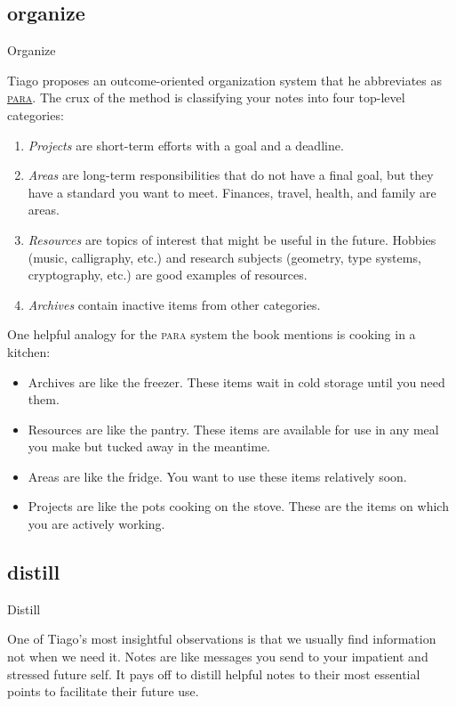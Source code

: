 \documentclass{article}
\begin{document}
\subsection{organize}{Organize}

Tiago proposes an outcome-oriented organization system that he abbreviates as \href{https://fortelabs.com/blog/para/}{\textsc{para}}.
The crux of the method is classifying your notes into four top-level categories:
\begin{enumerate}
  \item 
    \emph{Projects} are short-term efforts with a goal and a deadline.
  \item 
    \emph{Areas} are long-term responsibilities that do not have a final goal, but they have a standard you want to meet.
    Finances, travel, health, and family are areas.
  \item 
    \emph{Resources} are topics of interest that might be useful in the future.
    Hobbies (music, calligraphy, etc.) and research subjects (geometry, type systems, cryptography, etc.) are good examples of resources.
  \item 
    \emph{Archives} contain inactive items from other categories.
\end{enumerate}

One helpful analogy for the \textsc{para} system the book mentions is cooking in a kitchen:
\begin{itemize}
  \item Archives are like the freezer. These items wait in cold storage until you need them.
  \item Resources are like the pantry. These items are available for use in any meal you make but tucked away in the meantime.
  \item Areas are like the fridge. You want to use these items relatively soon.
  \item Projects are like the pots cooking on the stove. These are the items on which you are actively working.
\end{itemize}

\subsection{distill}{Distill}

One of Tiago's most insightful observations is that we usually find information not when we need it.
Notes are like messages you send to your impatient and stressed future self.
It pays off to distill helpful notes to their most essential points to facilitate their future use.
\end{document}
